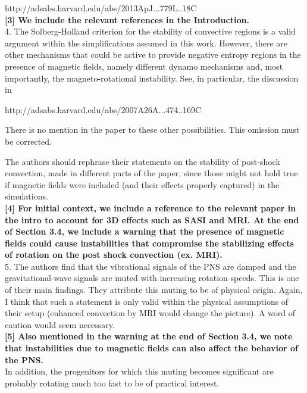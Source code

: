 \documentclass[11pt]{article}
\begin{document}
http://adsabs.harvard.edu/abs/2013ApJ...779L..18C\\

\textbf{[3] We include the relevant references in the Introduction.}\\


4. The Solberg-Holland criterion for the stability of convective regions is
a valid argument within the simplifications assumed in this work. However, 
there are other mechanisms that could be active to provide negative entropy 
regions in the presence of magnetic fields, namely different dynamo mechanisms 
and, most importantly, the magneto-rotational instability. See, in particular, 
the discussion in  

http://adsabs.harvard.edu/abs/2007A26A...474..169C

There is no mention in the paper to these other possibilities. This omission 
must be corrected.

The authors should rephrase their statements on the stability of post-shock 
convection, made in different parts of the paper, since those might not hold 
true if magnetic fields were included (and their effects properly captured) 
in the simulations.\\

\textbf{[4] For initial context, we include a reference to the relevant paper in the intro to account for 3D effects such as SASI and MRI.   At the end of Section 3.4, we include a warning that the presence of magnetic fields could cause instabilities that compromise the stabilizing effects of rotation on the post shock convection (ex. MRI).  }\\

5. The authors find that the vibrational signals of the PNS are damped and 
the gravitational-wave signals are muted with increasing rotation speeds. This
is one of their main findings. They attribute this muting to be of physical origin.
Again, I think that such a statement is only valid within the physical assumptions 
of their setup (enhanced convection by MRI would change the picture). A word of  caution would seem necessary. \\

\textbf{[5] Also mentioned in the warning at the end of Section 3.4, we note that instabilities due to magnetic fields can also affect the behavior of the PNS.}\\

In addition, the progenitors for which this muting becomes significant are probably rotating much too fast to be of practical 
interest. \\
\end{document}
